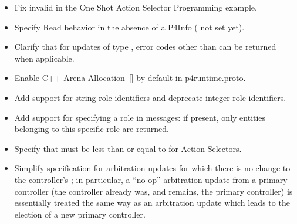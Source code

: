\documentclass[11pt]{article}
\begin{document}
{\begin{itemize}[noitemsep,topsep=\mdcompacttopsep]
\item{}Fix invalid  in the One Shot Action Selector Programming
example.%

\item{}Specify Read behavior in the absence of a P4Info (
not set yet).%

\item{}Clarify that for updates of type , error codes other than
 can be returned when applicable.%

\item{}Enable C++ Arena Allocation~[] by default in p4runtime.proto.%

\item{}Add support for string role identifiers and deprecate integer role
identifiers.%

\item{}Add support for specifying a role in  messages: if present, only
entities belonging to this specific role are returned.%

\item{}Specify that  must be less than or equal to  for Action
Selectors.%

\item{}Simplify specification for arbitration updates for which there is no change to
the controller's ; in particular, a \textquotedblleft{}no-op\textquotedblright{} arbitration update
from a primary controller (the controller already was, and remains, the
primary controller) is essentially treated the same way as an arbitration
update which leads to the election of a new primary controller.%


\end{itemize}}
\end{document}
